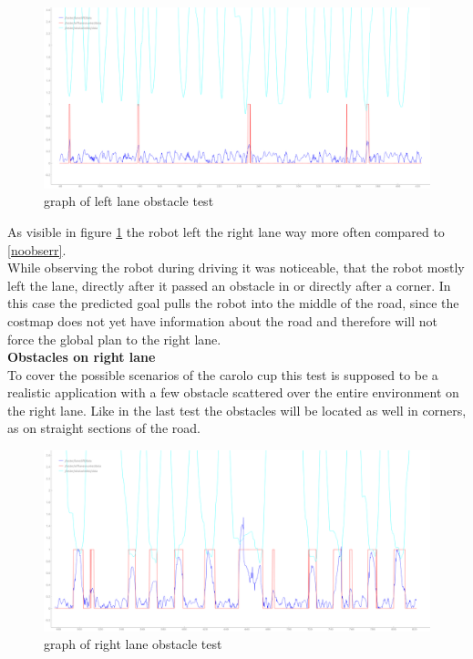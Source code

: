 \begin{figure}[H]
	\includegraphics[width=\textwidth]{Pictures/left obs final obs2}
	\caption{graph of left lane obstacle test}
	\label{leftobsfinal}
\end{figure}
As visible in figure \ref{leftobsfinal} the robot left the right lane way more often compared to \ref{noobserr}.\\
While observing the robot during driving it was noticeable, that the robot mostly left the lane, directly after it passed an obstacle in or directly after a corner. In this case the predicted goal pulls the robot into the middle of the road, since the costmap does not yet have information about the road and therefore will not force the global plan to the right lane. \\

\textbf{Obstacles on right lane}\\

To cover the possible scenarios of the carolo cup this test is supposed to be a realistic application with a few obstacle scattered over the entire environment on the right lane. Like in the last test the obstacles will be located as well in corners, as on straight sections of the road.

\begin{figure}[H]
	\includegraphics[width=\textwidth]{Pictures/right obs final obs}
	\caption{graph of right lane obstacle test}
	\label{rightobsfinal}
\end{figure}


